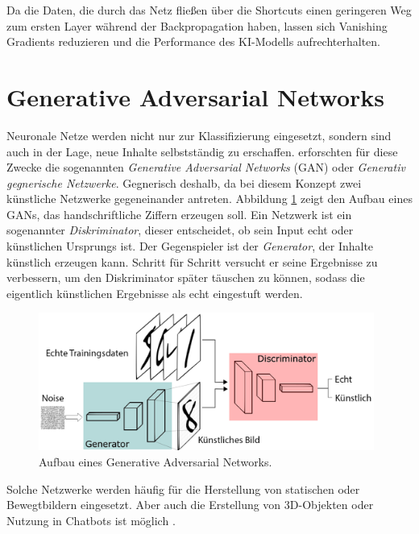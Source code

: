 Da die Daten, die durch das Netz fließen über die Shortcuts einen geringeren Weg zum ersten Layer während der Backpropagation haben, lassen sich Vanishing Gradients reduzieren und die Performance des KI-Modells aufrechterhalten.

\section{Generative Adversarial Networks}
Neuronale Netze werden nicht nur zur Klassifizierung eingesetzt, sondern sind auch in der Lage, neue Inhalte selbstständig zu erschaffen. \citet{Goodfellowgan} erforschten für diese Zwecke die sogenannten \textit{Generative Adversarial Networks} (GAN) oder \textit{Generativ gegnerische Netzwerke}. Gegnerisch deshalb, da bei diesem Konzept zwei künstliche Netzwerke gegeneinander antreten. Abbildung \ref{GAN} zeigt den Aufbau eines GANs, das handschriftliche Ziffern erzeugen soll. Ein Netzwerk ist ein sogenannter \textit{Diskriminator}, dieser entscheidet, ob sein Input echt oder künstlichen Ursprungs ist. Der Gegenspieler ist der \textit{Generator}, der Inhalte künstlich erzeugen kann. Schritt für Schritt versucht er seine Ergebnisse zu verbessern, um den Diskriminator später täuschen zu können, sodass die eigentlich künstlichen Ergebnisse als echt eingestuft werden.

\begin{figure}[ht]
    \centering
    \includegraphics[width=11cm]{bilder/GAN_Net.jpg}
    \caption{Aufbau eines Generative Adversarial Networks.}
    \label{GAN}
\end{figure}

Solche Netzwerke werden häufig für die Herstellung von statischen oder Bewegtbildern eingesetzt. Aber auch die Erstellung von 3D-Objekten oder Nutzung in Chatbots ist möglich \parencite[]{luber-2021}.

